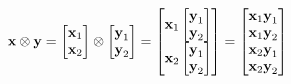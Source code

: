 \documentclass{article}
\begin{document}
	$$
	\text{\bfseries x} \otimes \text{\bfseries y} = \begin{bmatrix}
		\text{\bfseries x}_{1}\\
		\text{\bfseries x}_{2}
	\end{bmatrix} \otimes \begin{bmatrix}
	\text{\bfseries y}_{1}\\
	\text{\bfseries y}_{2}
	\end{bmatrix} = \begin{bmatrix}
		\text{\bfseries x}_{1} \begin{bmatrix}
		\text{\bfseries y}_{1}\\
		\text{\bfseries y}_{2}
		\end{bmatrix}\\
		\text{\bfseries x}_{2} \begin{bmatrix}
		\text{\bfseries y}_{1}\\
		\text{\bfseries y}_{2}
		\end{bmatrix}
	\end{bmatrix} = \begin{bmatrix}
		\text{\bfseries x}_{1} \text{\bfseries y}_{1}\\
		\text{\bfseries x}_{1} \text{\bfseries y}_{2}\\
		\text{\bfseries x}_{2} \text{\bfseries y}_{1}\\
		\text{\bfseries x}_{2} \text{\bfseries y}_{2}\\
	\end{bmatrix}$$
\end{document}

